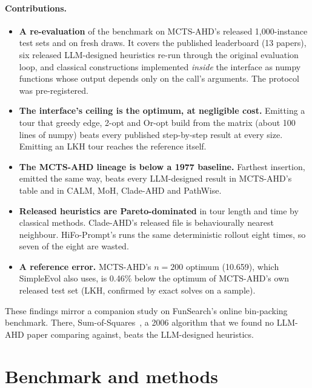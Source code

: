 \paragraph{Contributions.}
\begin{itemize}
\item \textbf{A re-evaluation} of the benchmark on MCTS-AHD's released 1,000-instance test sets and on
fresh draws. It covers the published leaderboard (13 papers), six released LLM-designed heuristics
re-run through the original evaluation loop, and classical constructions implemented
\emph{inside} the interface as numpy functions whose output depends only on the call's arguments. The protocol was pre-registered.
\item \textbf{The interface's ceiling is the optimum, at negligible cost.} Emitting a tour that
greedy edge, 2-opt and Or-opt build from the matrix (about 100 lines of numpy) beats every published
step-by-step result at every size. Emitting an LKH tour reaches the reference itself.
\item \textbf{The MCTS-AHD lineage is below a 1977 baseline.} Farthest insertion, emitted the same
way, beats every LLM-designed result in MCTS-AHD's table and in CALM, MoH, Clade-AHD and PathWise.
\item \textbf{Released heuristics are Pareto-dominated} in tour length and time by classical
methods. Clade-AHD's released file is behaviourally nearest neighbour. HiFo-Prompt's runs the same deterministic rollout eight times, so seven of the eight are wasted.
\item \textbf{A reference error.} MCTS-AHD's $n=200$ optimum (10.659), which SimpleEvol also uses, is 0.46\% below the optimum of MCTS-AHD's own released test set (LKH, confirmed by exact solves on a sample).
\end{itemize}
These findings mirror a companion study on FunSearch's online bin-packing benchmark. There,
Sum-of-Squares~\cite{csirik}, a 2006 algorithm that we found no LLM-AHD paper comparing against, beats the
LLM-designed heuristics.

\section{Benchmark and methods}\label{sec:method}
